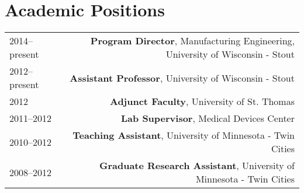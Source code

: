 \section*{Academic Positions}
\begin{tabular}{L!{\VRule}R}
2014--present&{\bf Program Director}, Manufacturing Engineering, University of Wisconsin - Stout\\
2012--present&{\bf Assistant Professor}, University of Wisconsin - Stout\\
2012&\textbf{Adjunct Faculty}, University of St. Thomas\\
2011--2012&\textbf{Lab Supervisor}, Medical Devices Center\\
2010--2012&\textbf{Teaching Assistant}, University of Minnesota - Twin Cities\\
2008--2012&\textbf{Graduate Research Assistant}, University of Minnesota - Twin Cities\\
\end{tabular}